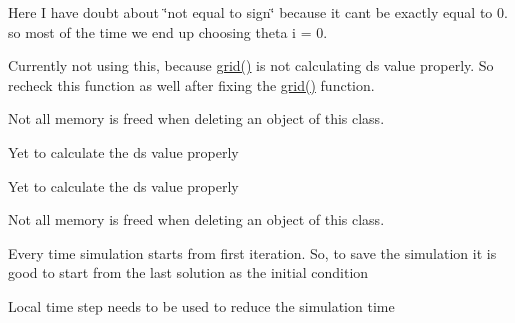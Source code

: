 \begin{DoxyRefList}
Here I have doubt about \char`\"{}not equal to sign\char`\"{} because it can\textquotesingle{}t be exactly equal to 0. so most of the time we end up choosing theta i = 0.  
\item[\label{bug__bug000003}%
\hypertarget{bug__bug000003}{}%
File \hyperlink{dt_8h}{dt.h} ]Currently not using this, because \hyperlink{grid__nozzle_8h_a6cdf5cf168063009e847db46d6624c1b}{grid()} is not calculating ds value properly. So recheck this function as well after fixing the \hyperlink{grid__nozzle_8h_a6cdf5cf168063009e847db46d6624c1b}{grid()} function.  
\item[\label{bug__bug000004}%
\hypertarget{bug__bug000004}{}%
File \hyperlink{eulerflux_8h}{eulerflux.h} ]Not all memory is freed when deleting an object of this class.  
\item[\label{bug__bug000005}%
\hypertarget{bug__bug000005}{}%
Member \hyperlink{run_8h_ac7609273a01eb63ff8a25ddf1aafeff7}{grid} (vector$<$ vector$<$ vector$<$ vector$<$ double $>$ $>$ $>$ $>$ \&i\+Face\+Area\+Vector, vector$<$ vector$<$ vector$<$ vector$<$ double $>$ $>$ $>$ $>$ \&j\+Face\+Area\+Vector, vector$<$ vector$<$ vector$<$ vector$<$ double $>$ $>$ $>$ $>$ \&k\+Face\+Area\+Vector, vector$<$ vector$<$ vector$<$ double $>$ $>$ $>$ \&Cell\+Volume, vector$<$ vector$<$ vector$<$ double $>$ $>$ $>$ \&delta\+\_\+s, int \&Ni, int \&Nj, int \&Nk)]Yet to calculate the ds value properly  
\item[\label{bug__bug000005}%
\hypertarget{bug__bug000005}{}%
Member \hyperlink{run_8h_ac7609273a01eb63ff8a25ddf1aafeff7}{grid} (vector$<$ vector$<$ vector$<$ vector$<$ double $>$ $>$ $>$ $>$ \&i\+Face\+Area\+Vector, vector$<$ vector$<$ vector$<$ vector$<$ double $>$ $>$ $>$ $>$ \&j\+Face\+Area\+Vector, vector$<$ vector$<$ vector$<$ vector$<$ double $>$ $>$ $>$ $>$ \&k\+Face\+Area\+Vector, vector$<$ vector$<$ vector$<$ double $>$ $>$ $>$ \&Cell\+Volume, vector$<$ vector$<$ vector$<$ double $>$ $>$ $>$ \&delta\+\_\+s, int \&Ni, int \&Nj, int \&Nk)]Yet to calculate the ds value properly  
\item[\label{bug__bug000006}%
\hypertarget{bug__bug000006}{}%
File \hyperlink{netfluxinterface_8h}{netfluxinterface.h} ]Not all memory is freed when deleting an object of this class.  
\item[\label{bug__bug000007}%
\hypertarget{bug__bug000007}{}%
Member \hyperlink{run_8h_a13a43e6d814de94978c515cb084873b1}{run} ()]Every time simulation starts from first iteration. So, to save the simulation it is good to start from the last solution as the initial condition 

Local time step needs to be used to reduce the simulation time 
\end{DoxyRefList}